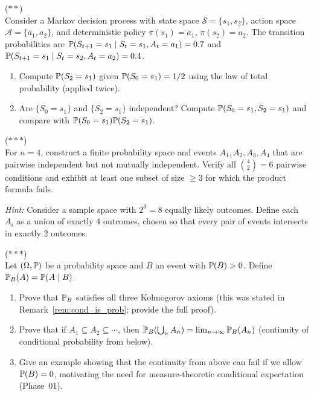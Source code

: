 \documentclass[11pt,a4paper]{article}
\begin{document}
\begin{exercise}
\textnormal{(\(\ast\ast\))} \\
Consider a Markov decision process with state space
$\mathcal{S} = \{s_1, s_2\}$, action space
$\mathcal{A} = \{a_1, a_2\}$, and deterministic policy
$\pi(s_1) = a_1$, $\pi(s_2) = a_2$. The transition probabilities are
$\mathbb{P}(S_{t+1} = s_1 \mid S_t = s_1, A_t = a_1) = 0.7$ and
$\mathbb{P}(S_{t+1} = s_1 \mid S_t = s_2, A_t = a_2) = 0.4$.
\begin{enumerate}[nosep,label=(\alph*)]
    \item Compute $\mathbb{P}(S_2 = s_1)$ given $\mathbb{P}(S_0 = s_1) = 1/2$
    using the law of total probability (applied twice).
    \item Are $\{S_0 = s_1\}$ and $\{S_2 = s_1\}$ independent? Compute
    $\mathbb{P}(S_0 = s_1, S_2 = s_1)$ and compare with
    $\mathbb{P}(S_0 = s_1) \mathbb{P}(S_2 = s_1)$.
\end{enumerate}
\end{exercise}

\begin{exercise}
\textnormal{(\(\ast\ast\ast\))} \\
For $n = 4$, construct a finite probability space and events
$A_1, A_2, A_3, A_4$ that are pairwise independent but not mutually
independent. Verify all $\binom{4}{2} = 6$ pairwise conditions and
exhibit at least one subset of size $\geq 3$ for which the product
formula fails.

\textit{Hint:} Consider a sample space with $2^3 = 8$ equally likely
outcomes. Define each $A_i$ as a union of exactly 4 outcomes, chosen so
that every pair of events intersects in exactly 2 outcomes.
\end{exercise}

\begin{exercise}
\textnormal{(\(\ast\ast\ast\))} \\
Let $(\Omega, \mathbb{P})$ be a probability space and $B$ an event with
$\mathbb{P}(B) > 0$. Define $\mathbb{P}_B(A) = \mathbb{P}(A \mid B)$.
\begin{enumerate}[nosep,label=(\alph*)]
    \item Prove that $\mathbb{P}_B$ satisfies all three Kolmogorov axioms
    (this was stated in Remark~\ref{rem:cond_is_prob}; provide the full
    proof).
    \item Prove that if $A_1 \subseteq A_2 \subseteq \cdots$, then
    $\mathbb{P}_B(\bigcup_n A_n) = \lim_{n \to \infty} \mathbb{P}_B(A_n)$
    (continuity of conditional probability from below).
    \item Give an example showing that the continuity from above can fail
    if we allow $\mathbb{P}(B) = 0$, motivating the need for measure-theoretic
    conditional expectation (Phase~01).
\end{enumerate}
\end{exercise}
\end{document}
